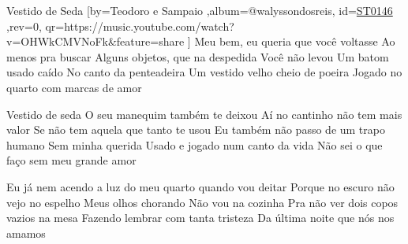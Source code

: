 \beginsong
{Vestido de Seda %
}[by={Teodoro e Sampaio %
},album={@walyssondosreis},
id={\href{https://music.youtube.com/watch?v=OHWkCMVNoFk&feature=share %
}{ST0146 %
}},rev={0}, %
qr={https://music.youtube.com/watch?v=OHWkCMVNoFk&feature=share %
}]
\beginverse 
Meu bem, eu queria que você voltasse
Ao menos pra buscar
Alguns objetos, que na despedida
Você não levou
Um batom usado caído
No canto da penteadeira
Um vestido velho cheio de poeira
Jogado no quarto com marcas de amor
\endverse

\beginchorus
Vestido de seda
O seu manequim também te deixou
Aí no cantinho não tem mais valor
Se não tem aquela que tanto te usou
Eu também não passo de um trapo humano
Sem minha querida
Usado e jogado num canto da vida
Não sei o que faço sem meu grande amor
\endchorus

\beginverse 
Eu já nem acendo a luz do meu quarto
quando vou deitar
Porque no escuro não vejo no espelho
Meus olhos chorando
Não vou na cozinha
Pra não ver dois copos vazios na mesa
Fazendo lembrar com tanta tristeza
Da última noite que nós nos amamos
\endverse


